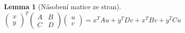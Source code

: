 \documentclass{article}
\newenvironment{pitemize}{
\begin{itemize}
  \setlength{\itemsep}{5pt}
  \setlength{\parskip}{0pt}
  \setlength{\parsep}{0pt}
}{\end{itemize}}
\newenvironment{pproof}{
\noindent\emph{Důkaz.}
\begin{pitemize}
}{\hfill$\square$\end{pitemize}}
\newtheorem{lemma}{Lemma}
\theoremstyle{definition}
\begin{document}
\begin{comment}
\begin{lemma}[Převod na čtverec]
\label{ctverec}
Ukážu-li u pravděpodobnostního rozdělení $p(x)$, že $$\ln(p(x))=-\frac{1}{2}x^T\Sigma^{-1}x+x^TB+c,$$ kde konstanta $c$ nezávisí na $x$ a $\Sigma^{-1}$ je pozitivně definitní, potom je $p(x)$ hustota pravděpodobnosti\footnote{dále jen pdf} multivariate gausiánu s kovarianční maticí $\Sigma={\Sigma^{-1}}^{-1}$ a očekávanou hodnotou $\Sigma B$
\end{lemma}

\begin{pproof}

\item rozdělení je pdf mult. gaus. právě tehdy, když $p(x)=(2\pi)^{-\frac{k}{2}}|\Sigma|^{-\frac{1}{2}}\, e^{ -\frac{1}{2}(\mathbf{x}-\mu)^T\Sigma^{-1}(\mathbf{x}-\mu) }$

\item protože se jedná o rozdělení (a tedy už víme, že je normalizované), tak stačí místo rovnítka pouze $\propto$ 

\item tj. stačí, že $p(x) \propto e^{ -\frac{1}{2}(\mathbf{x}-\mu)^T\Sigma^{-1}(\mathbf{x}-\mu) }$

\item to je právě tehdy, když $\ln(p(x))=-\frac{1}{2}(x-\mu)^T\Sigma^{-1}(x-\mu)+c$, kde $c$ je libovolná konstanta (z násobku se stal sčítanec vpravo)
\item Podle Lemmatu \ref{obecny_ctverec} (a protože inverze pozitivně definitní matice je taky pozitivně definitní\footnote{\url{http://math.stackexchange.com/questions/211453/inverse-of-a-positive-definite}} a pozitivně definitní matice je symetrická) je to tehdy, když $\ln(p(x))=-\frac{1}{2}x^T\Sigma^{-1}x+x^T\Sigma^{-1}\mu-\frac{1}{2}\mu^T\Sigma^{-1}\mu+c$, přičemž $\frac{1}{2}\mu^T\Sigma^{-1}\mu$ nezávisí na $x$ a tedy lze ho zahrnout do konstanty, tj. stačí $\ln(x)=-\frac{1}{2}x^T\Sigma^{-1}x+x^T\Sigma^{-1}\mu+c$
\item Mám-li teď tedy pravděpodobnostní rozdělení z definice, označím si $\mu=\Sigma B$, potom \linebreak
$\ln(p(x))=-\frac{1}{2}x^T\Sigma^{-1}x+x^T\Sigma^{-1}\Sigma B=-\frac{1}{2}x^T\Sigma^{-1}x+x^T\Sigma^{-1}\mu,$ tedy splnili jsme podmínky a jde o mult. gausián
\end{pproof}
\end{comment}

\begin{lemma}[Násobení matice ze stran]
\label{nasobmatic}
$\left(\begin{matrix}x\\y \end{matrix}\right)^T\left(\begin{matrix}A&B\\C&D \end{matrix}\right)\left(\begin{matrix}u\\ v \end{matrix}\right) = x^TAu+y^TDv+x^TBv+y^TCu$
\end{lemma}
\end{document}
